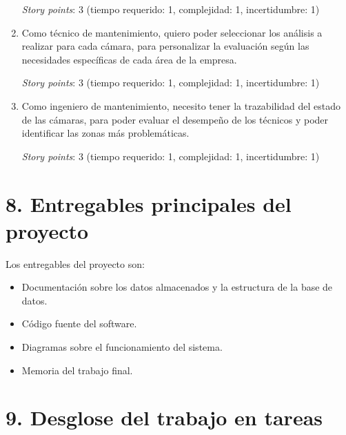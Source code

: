 \documentclass[
11pt, %
]{charter}
\begin{document}
\begin{enumerate}
\textit{Story points}: 3 (tiempo requerido: 1, complejidad: 1, incertidumbre: 1)			
	
	\item Como técnico de mantenimiento, quiero poder seleccionar los análisis a realizar para cada cámara, para personalizar la evaluación según las necesidades específicas de cada área de la empresa.
	
\textit{Story points}: 3 (tiempo requerido: 1, complejidad: 1, incertidumbre: 1)		
	
	\item Como ingeniero de mantenimiento, necesito tener la trazabilidad del estado de las cámaras, para poder evaluar el desempeño de los técnicos y poder identificar las zonas más problemáticas.
	
\textit{Story points}: 3 (tiempo requerido: 1, complejidad: 1, incertidumbre: 1)		
	
\end{enumerate}


\section{8. Entregables principales del proyecto}
\label{sec:entregables}

Los entregables del proyecto son:

\begin{itemize}
	\item Documentación sobre los datos almacenados y la estructura de la base de datos.
	\item Código fuente del software.
	\item Diagramas sobre el funcionamiento del sistema.
	\item Memoria del trabajo final.
\end{itemize}

\section{9. Desglose del trabajo en tareas}
\label{sec:wbs}
\end{document}
